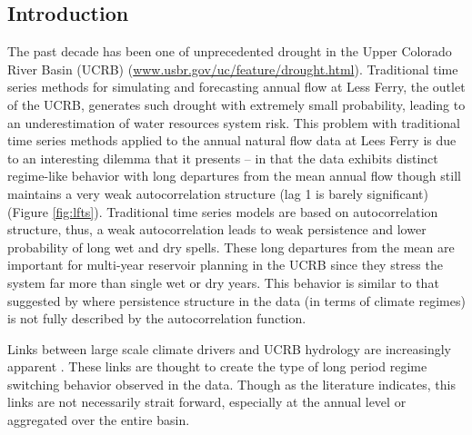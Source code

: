 \documentclass[wrr]{AGUTeX}
\begin{document}
%
\begin{article}

%
%

\section{Introduction}

The past decade has been one of unprecedented drought in the Upper Colorado River Basin (UCRB) (\url{www.usbr.gov/uc/feature/drought.html}). Traditional time series methods for simulating and forecasting \citep{Salas1980} annual flow at Less Ferry, the outlet of the UCRB, generates such drought with extremely small probability, leading to an underestimation of water resources system risk. This problem with traditional time series methods applied to the annual natural flow data at Lees Ferry is due to an interesting dilemma that it presents -- in that the data exhibits distinct regime-like behavior with long departures from the mean annual flow though still maintains a very weak autocorrelation structure (lag 1 is barely significant)  (Figure \ref{fig:lfts}). Traditional time series models are based on autocorrelation structure, thus, a weak autocorrelation leads to weak persistence and lower probability of long wet and dry spells.  These long departures from the mean are important for multi-year reservoir planning in the UCRB since they stress the system far more than single wet or dry years.  This behavior is similar to that suggested by \cite{Akntug:2005wx} where persistence structure in the data (in terms of climate regimes) is not fully described by the autocorrelation function. 

Links between large scale climate drivers and UCRB hydrology are increasingly apparent \citep{Timlsena:2009it,McCabe:2007vh,Hunter:2006fa,Grantz:2005ve,Hidalgo:2003ue,Piechota:1996dd,Nash:1991ty}.  These links are thought to create the type of long period regime switching behavior observed in the data.  Though as the literature indicates, this links are not necessarily strait forward, especially at the annual level or aggregated over the entire basin.  


\end{article}
\end{document}
